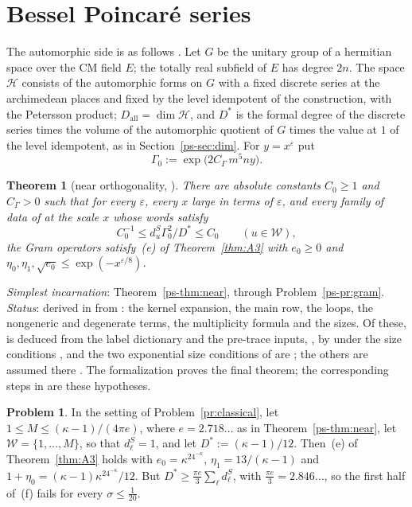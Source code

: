 \documentclass[reqno]{amsart}
\theoremstyle{definition}
\newtheorem{problem}{Problem}[section]
\theoremstyle{plain}
\newtheorem{theorem}{Theorem}[section]
\newcommand{\Hc}{\mathcal{H}}
\newcommand{\Wc}{\mathcal{W}}
\newcommand{\Dall}{D_{\mathrm{all}}}
\newcommand{\dS}{d^{S}}
\begin{document}
\section{Bessel Poincar\'e series}\label{sec:bessel}

The automorphic side is as follows \cite[\S14.1]{Adr}.  Let \(G\) be the unitary group of a hermitian space over the CM field \(E\); the totally real subfield of \(E\) has degree \(2n\).  The space \(\Hc\) consists of the automorphic forms on \(G\) with a fixed discrete series at the archimedean places and fixed by the level idempotent of the construction, with the Petersson product; \(\Dall = \dim\Hc\), and \(D^*\) is the formal degree of the discrete series times the volume of the automorphic quotient of \(G\) times the value at \(1\) of the level idempotent, as in Section~\ref{ps-sec:dim}.  For \(y = x^\varepsilon\) put
\[
  \Gamma_0 := \exp\bigl(2C_\Gamma\,m^5ny\bigr) .
\]

\begin{theorem}[near orthogonality, {\cite[Thm.~14.1]{Adr}}]\label{thm:near}
There are absolute constants \(C_0 \ge 1\) and \(C_\Gamma > 0\) such that for every \(\varepsilon\), every \(x\) large in terms of \(\varepsilon\), and every family of data of \cite[Part~II]{Adr} at the scale \(x\) whose words satisfy
\begin{equation}\label{eq:window}
  C_0^{-1} \le \dS_u\Gamma_0^2/D^* \le C_0 \qquad (u \in \Wc) ,
\end{equation}
the Gram operators satisfy~(e) of Theorem~\ref{thm:A3} with \(e_0 \ge 0\) and \(\eta_0, \eta_1, \sqrt{e_0} \le \exp(-x^{\varepsilon/8})\).
\end{theorem}

\emph{Simplest incarnation}: Theorem~\ref{ps-thm:near}, through Problem~\ref{ps-pr:gram}.  \emph{Status}: derived in \cite[Thm.~14.79]{Adr} from \cite[Hyps.~14.71--14.77]{Adr}: the kernel expansion, the main row, the loops, the nongeneric and degenerate terms, the multiplicity formula and the sizes.  Of these, \cite[Hyp.~14.76]{Adr} is deduced from the label dictionary and the pre-trace inputs, \cite[Hyps.~14.59 and~14.61]{Adr}, by \cite[Cor.~14.63]{Adr} under the size conditions \cite[(14.20)]{Adr}, and the two exponential size conditions of \cite[Hyp.~14.77]{Adr} are \cite[Lemma~14.78]{Adr}; the others are assumed there \cite[\S18.7]{Adr}.  The formalization proves the final theorem; the corresponding steps in \cite{Adr} are these hypotheses.

\begin{problem}\label{pr:sl2}
In the setting of Problem~\ref{pr:classical}, let \(1 \le M \le (\kappa-1)/(4\pi e)\), where \(e = 2.718\ldots\) as in Theorem~\ref{ps-thm:near}, let \(\Wc = \{1, \dots, M\}\), so that \(\dS_\ell = 1\), and let \(D^* := (\kappa-1)/12\).  Then~(e) of Theorem~\ref{thm:A3} holds with \(e_0 = \kappa^24^{-\kappa}\), \(\eta_1 = 13/(\kappa-1)\) and \(1 + \eta_0 = (\kappa-1)\kappa^24^{-\kappa}/12\).  But \(D^* \ge \frac{\pi e}3\sum_\ell \dS_\ell\), with \(\frac{\pi e}{3} = 2.846\ldots\), so the first half of~(f) fails for every \(\sigma \le \frac1{20}\).
\end{problem}
\end{document}
